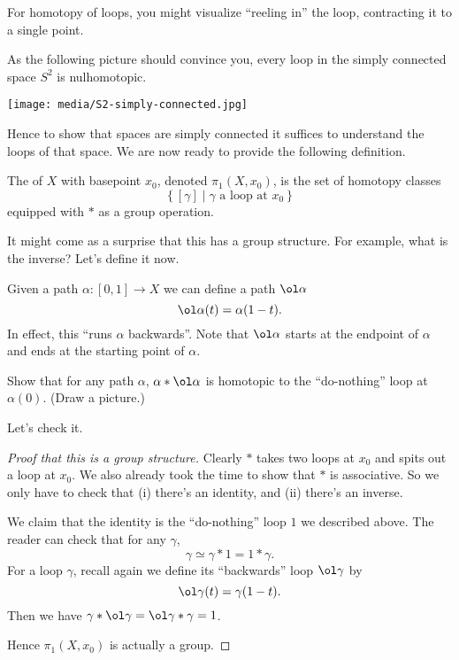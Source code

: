 For homotopy of loops, you might visualize ``reeling in'' the loop, contracting it to a single point.

\begin{example}
	As the following picture should convince you, every loop in
	the simply connected space $S^2$ is nulhomotopic.
	\begin{center}
		\texttt{[image: media/S2-simply-connected.jpg]}
	\end{center}
\end{example}

Hence to show that spaces are simply connected it suffices to understand
the loops of that space.
We are now ready to provide the following definition.
\begin{definition}
	The  of $X$ with basepoint $x_0$,
	denoted $\pi_1(X, x_0)$, is the set of homotopy classes
	\[ \left\{ [\gamma] \mid \gamma \text{ a loop at $x_0$} \right\} \]
	equipped with $\ast$ as a group operation.
\end{definition}

It might come as a surprise that this has a group structure.
For example, what is the inverse?
Let's define it now.
\begin{definition}
	Given a path $\alpha : [0,1] \to X$ we can define a path $\ol\alpha$
	\[ \ol\alpha (t) = \alpha(1-t). \]
	In effect, this ``runs $\alpha$ backwards''.
	Note that $\ol\alpha$ starts at the endpoint of $\alpha$
	and ends at the starting point of $\alpha$.
\end{definition}
\begin{exercise}
	Show that for any path $\alpha$,
	$\alpha \ast \ol\alpha$ is homotopic
	to the ``do-nothing'' loop at $\alpha(0)$.
	(Draw a picture.)
\end{exercise}

Let's check it.
\begin{proof}
	[Proof that this is a group structure]
	Clearly $\ast$ takes two loops at $x_0$ and spits out a loop at $x_0$.
	We also already took the time to show that $\ast$ is associative.
	So we only have to check that (i) there's an identity, and (ii)
	there's an inverse.
	\begin{itemize}
		\ii We claim that the identity is the ``do-nothing'' loop $1$
		we described above. The reader can check that for any $\gamma$,
		\[ \gamma \simeq \gamma \ast 1 = 1 \ast \gamma. \]
		\ii For a loop $\gamma$, recall again we define its ``backwards'' loop $\ol\gamma$ by
		\[ \ol\gamma(t) = \gamma(1-t). \]
		Then we have $\gamma \ast \ol\gamma = \ol\gamma \ast \gamma = 1$.
	\end{itemize}
	Hence $\pi_1(X,x_0)$ is actually a group.
\end{proof}

